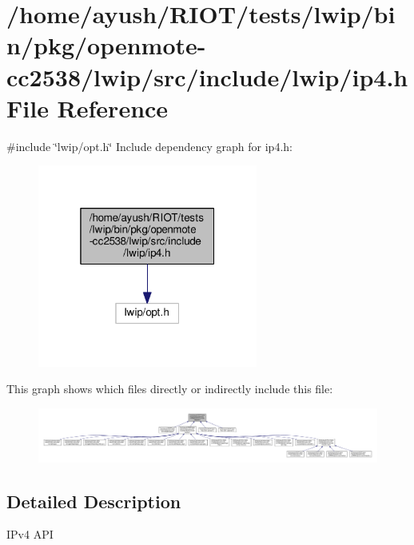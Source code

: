 \hypertarget{openmote-cc2538_2lwip_2src_2include_2lwip_2ip4_8h}{}\section{/home/ayush/\+R\+I\+O\+T/tests/lwip/bin/pkg/openmote-\/cc2538/lwip/src/include/lwip/ip4.h File Reference}
\label{openmote-cc2538_2lwip_2src_2include_2lwip_2ip4_8h}
{\ttfamily \#include \char`\"{}lwip/opt.\+h\char`\"{}}\newline
Include dependency graph for ip4.\+h\+:
\nopagebreak
\begin{figure}[H]
\begin{center}
\leavevmode
\includegraphics[width=205pt]{openmote-cc2538_2lwip_2src_2include_2lwip_2ip4_8h__incl}
\end{center}
\end{figure}
This graph shows which files directly or indirectly include this file\+:
\nopagebreak
\begin{figure}[H]
\begin{center}
\leavevmode
\includegraphics[width=350pt]{openmote-cc2538_2lwip_2src_2include_2lwip_2ip4_8h__dep__incl}
\end{center}
\end{figure}


\subsection{Detailed Description}
I\+Pv4 A\+PI 